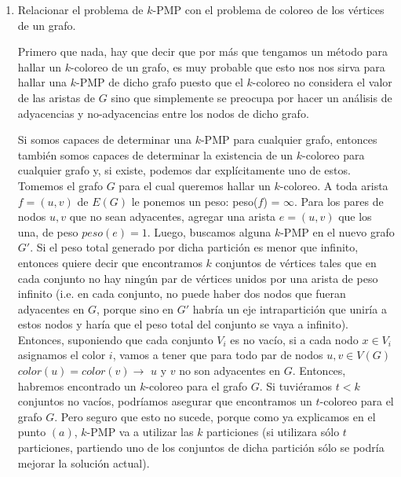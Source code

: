 \documentclass[11pt, a4paper, twoside]{article}
\begin{document}
\begin{enumerate}
\begin{enumerate}
			   
			      
			  \end{enumerate}
		
			\item Relacionar el problema de $k$-PMP con el problema de coloreo de los vértices
				  de un grafo.
				  
				  Primero que nada, hay que decir que por más que tengamos un método para hallar
				  un $k$-coloreo de un grafo, es muy probable que esto nos nos sirva para hallar una
				  $k$-PMP de dicho grafo puesto que el $k$-coloreo no considera el valor de las 
				  aristas de $G$ sino que simplemente se preocupa por hacer un análisis de 
				  adyacencias y no-adyacencias entre los nodos de dicho grafo.
				  
				  Si somos capaces de determinar una $k$-PMP para cualquier grafo, entonces también
				  somos capaces de determinar la existencia de un $k$-coloreo para cualquier
				  grafo y, si existe, podemos dar explícitamente uno de estos. \\
				  Tomemos el grafo $G$ para el cual queremos hallar un 
				  $k$-coloreo.
				  A toda arista $f=(u,v)$ de $E(G)$ le ponemos un peso: peso($f$) = $\infty$.
				  Para los pares de nodos $u,v$ que no sean adyacentes, agregar
				  una arista $e=(u,v)$ que los una, de peso $peso(e) = 1$. Luego, buscamos
				  alguna $k$-PMP en el nuevo grafo $G'$. Si el peso total generado por dicha 
				  partición es menor que infinito, entonces quiere decir que encontramos $k$ 
				  conjuntos de vértices tales que en cada conjunto no hay ningún par de vértices 
				  unidos por una arista de peso infinito (i.e. en cada conjunto, no puede haber
				  dos nodos que fueran adyacentes en $G$, porque sino en $G'$ habría un eje
				  intrapartición que uniría a estos nodos y haría que el peso total del conjunto
				  se vaya a infinito).
				  Entonces, suponiendo que cada conjunto $V_{i}$ es no vacío,  
				  si a cada nodo $x \in V_{i}$ asignamos el color $i$, vamos a tener que
				  para todo par de nodos $u,v \in V(G)$ $color(u)=color(v) \rightarrow $ $u$ y $v$ 
				  no son adyacentes en $G$. Entonces, habremos encontrado un $k$-coloreo para el
				  grafo $G$. Si tuviéramos $t < k$ conjuntos no vacíos,
				  podríamos asegurar que encontramos un $t$-coloreo para el grafo $G$. Pero seguro que
				  esto no sucede, porque como ya explicamos en el punto $(a)$, $k$-PMP va a utilizar las
				  $k$ particiones (si utilizara sólo $t$ particiones, partiendo uno de los conjuntos de 
				  dicha partición sólo se podría mejorar la solución actual). \\
 

\end{enumerate}
\end{document}
